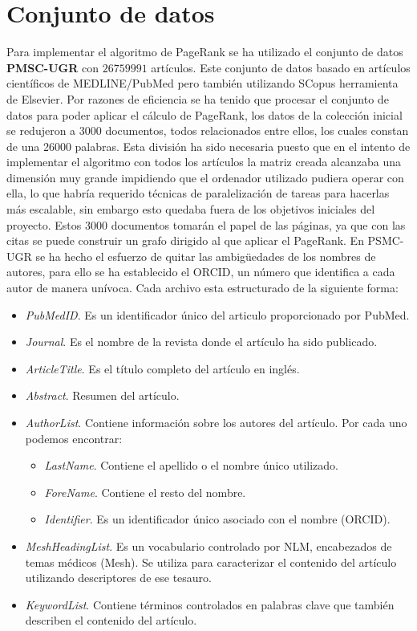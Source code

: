 \documentclass[size=a4, parskip=half, titlepage=false, toc=flat, toc=bib, 12pt, twoside]{scrartcl}
\theoremstyle{theorem-style}
\theoremstyle{definition-style}
\theoremstyle{remark-style}
\theoremstyle{example-style}
\theoremstyle{definition-style}
\theoremstyle{remark-style}
\begin{document}
\section{Conjunto de datos}
\label{Base de datos}
Para implementar el algoritmo de PageRank se ha utilizado el conjunto de datos \textbf{PMSC-UGR} con $26759991$ artículos. Este conjunto de datos basado en artículos científicos de MEDLINE/PubMed  pero también utilizando SCopus herramienta de Elsevier. Por razones de eficiencia se ha tenido que procesar el conjunto de datos para poder aplicar el cálculo de PageRank, los datos de la colección inicial se redujeron a 3000 documentos, todos relacionados entre ellos, los cuales constan de una 26000 palabras. Esta división ha sido necesaria puesto que en el intento de implementar el algoritmo con todos los artículos la matriz creada alcanzaba una dimensión muy grande impidiendo que el ordenador utilizado pudiera operar con ella, lo que habría requerido técnicas de paralelización de tareas para hacerlas más escalable, sin embargo esto quedaba fuera de los objetivos iniciales del proyecto. Estos 3000 documentos tomarán el papel de las páginas, ya que con las citas se puede construir un grafo dirigido al que aplicar el PageRank. En PSMC-UGR se ha hecho el esfuerzo de quitar las ambigüedades de los nombres de autores, para ello se ha establecido el ORCID, un número que identifica a cada autor de manera unívoca. Cada archivo esta estructurado de la siguiente forma:
\begin{itemize}
\item \textit{PubMedID}. Es un identificador único del articulo proporcionado por PubMed.
\item \textit{Journal}. Es el nombre de la revista donde el artículo ha sido publicado.
\item \textit{ArticleTitle}. Es el título completo del artículo en inglés.
\item \textit{Abstract}. Resumen del artículo.
\item \textit{AuthorList}. Contiene información sobre los autores del artículo. Por cada uno podemos encontrar:
\begin{itemize}
\item \textit{LastName}. Contiene el apellido o el nombre único utilizado.
\item \textit{ForeName}. Contiene el resto del nombre.
\item \textit{Identifier}. Es un identificador único asociado con el nombre (ORCID).
\end{itemize}
\item \textit{MeshHeadingList}. Es un vocabulario controlado por NLM, encabezados de temas médicos (Mesh). Se utiliza para caracterizar el contenido del artículo utilizando descriptores de ese tesauro.
\item \textit{KeywordList}. Contiene términos controlados en palabras clave que también describen el contenido del artículo.
\end{itemize}
\end{document}
